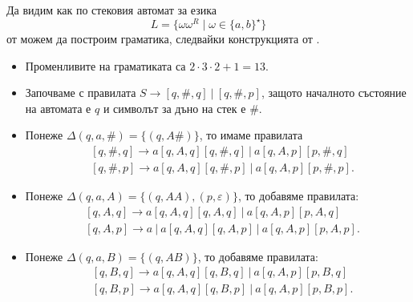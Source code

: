 \begin{example}
  Да видим как по стековия автомат за езика 
  \[L = \{\omega\omega^R \mid \omega \in \{a,b\}^\star\}\]
  от  можем да построим граматика, следвайки конструкцията от .

  \begin{itemize}
  \item
    Променливите на граматиката са $2 \cdot 3 \cdot 2 + 1 = 13$.
  \item 
    Започваме с правилата $S \to [q,\#,q]\ |\ [q,\#,p]$,
    защото началното състояние на автомата е $q$ и символът за дъно на стек е $\#$.
  \item
    Понеже $\Delta(q, a, \#) = \{(q, A\#)\}$, то имаме правилата
    \begin{align*}
      & [q, \#, q] \to a[q,A,q][q,\#,q]\ |\ a[q,A,p][p,\#,q]\\
      & [q, \#, p] \to a[q,A,q][q,\#,p]\ |\ a[q,A,p][p,\#,p].
    \end{align*}
  \item
    Понеже $\Delta(q, a, A) = \{(q, AA), (p, \varepsilon)\}$, то добавяме правилата:
    \begin{align*}
      & [q,A,q] \to a[q, A, q][q,A,q]\ |\ a[q,A,p][p,A,q]\\
      & [q,A,p] \to a\ |\ a[q, A, q][q,A,p]\ |\ a[q,A,p][p,A,p].
    \end{align*}
  \item
    Понеже $\Delta(q, a, B) = \{(q, AB)\}$, то добавяме правилата:
    \begin{align*}
      & [q, B, q] \to a[q,A,q][q,B,q]\ |\ a[q,A,p][p,B,q]\\
      & [q, B, p] \to a[q,A,q][q,B,p]\ |\ a[q,A,p][p,B,p].
    \end{align*}
  \end{itemize}
\end{example}


